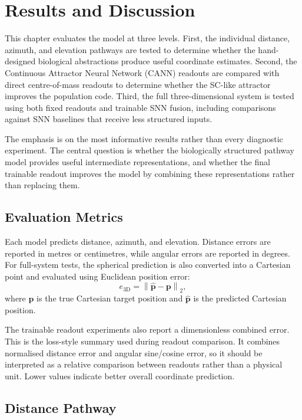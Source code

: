 \chapter{Results and Discussion} \label{ch:results}

This chapter evaluates the model at three levels. First, the individual distance, azimuth, and elevation pathways are tested to determine whether the hand-designed biological abstractions produce useful coordinate estimates. Second, the Continuous Attractor Neural Network (CANN) readouts are compared with direct centre-of-mass readouts to determine whether the SC-like attractor improves the population code. Third, the full three-dimensional system is tested using both fixed readouts and trainable SNN fusion, including comparisons against SNN baselines that receive less structured inputs.

The emphasis is on the most informative results rather than every diagnostic experiment. The central question is whether the biologically structured pathway model provides useful intermediate representations, and whether the final trainable readout improves the model by combining these representations rather than replacing them.

\section{Evaluation Metrics}

Each model predicts distance, azimuth, and elevation. Distance errors are reported in metres or centimetres, while angular errors are reported in degrees. For full-system tests, the spherical prediction is also converted into a Cartesian point and evaluated using Euclidean position error:
\begin{equation}
    e_{\mathrm{3D}}
    =
    \left\|
        \hat{\mathbf{p}} - \mathbf{p}
    \right\|_2 ,
\end{equation}
where $\mathbf{p}$ is the true Cartesian target position and $\hat{\mathbf{p}}$ is the predicted Cartesian position.

The trainable readout experiments also report a dimensionless combined error. This is the loss-style summary used during readout comparison. It combines normalised distance error and angular sine/cosine error, so it should be interpreted as a relative comparison between readouts rather than a physical unit. Lower values indicate better overall coordinate prediction.

\section{Distance Pathway}

